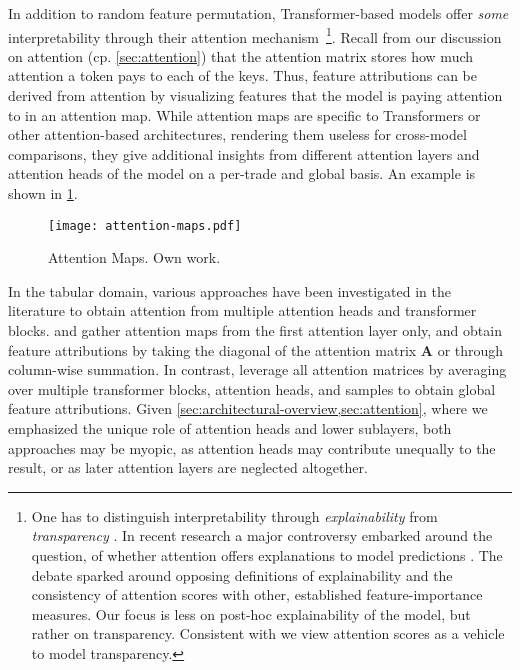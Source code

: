 In addition to random feature permutation, Transformer-based models offer \emph{some} interpretability through their attention mechanism~\footnote{One has to distinguish interpretability through \emph{explainability} from \emph{transparency} \autocite[][4--5]{liptonMythosModelInterpretability2017}. In recent research a major controversy embarked around the question, of whether attention offers explanations to model predictions \autocites[cp.][150]{bastingsElephantInterpretabilityRoom2020}[][5--7]{jainAttentionNotExplanation2019}[][9]{wiegreffeAttentionNotNot2019}. The debate sparked around opposing definitions of explainability and the consistency of attention scores with other, established feature-importance measures. Our focus is less on post-hoc explainability of the model, but rather on transparency. Consistent with \textcite[][8]{wiegreffeAttentionNotNot2019} we view attention scores as a vehicle to model transparency.
}. Recall from our discussion on attention (cp. \cref{sec:attention}) that the attention matrix stores how much attention a token pays to each of the keys. Thus, feature attributions can be derived from attention by visualizing features that the model is paying attention to in an attention map. While attention maps are specific to Transformers or other attention-based architectures, rendering them useless for cross-model comparisons, they give additional insights from different attention layers and attention heads of the model on a per-trade and global basis. An example is shown in \cref{fig:attention-maps}.

\begin{figure}[ht]
    \centering
    \texttt{[image: attention-maps.pdf]}
    \caption[Attention Maps]{Attention Maps. Own work.}
    \label{fig:attention-maps}
\end{figure}

In the tabular domain, various approaches have been investigated in the literature to obtain attention from multiple attention heads and transformer blocks. \textcite[][18]{somepalliSAINTImprovedNeural2021} and \textcite[][11]{borisovDeepNeuralNetworks2022} gather attention maps from the first attention layer only, and \textcite[][11]{borisovDeepNeuralNetworks2022} obtain feature attributions by taking the diagonal of the attention matrix $\boldsymbol{A}$ or through column-wise summation. In contrast, \textcite[][10]{gorishniyRevisitingDeepLearning2021} leverage all attention matrices by averaging over multiple transformer blocks, attention heads, and samples to obtain global feature attributions. Given \cref{sec:architectural-overview,sec:attention}, where we emphasized the unique role of attention heads and lower sublayers, both approaches may be myopic, as attention heads may contribute unequally to the result, or as later attention layers are neglected altogether.


